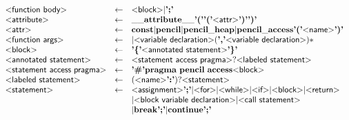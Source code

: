 \begin{figure}
\[\begin{array}{lcl}
  \text{\sf\textless function body\textgreater} & \gets & \text{\sf\textless block\textgreater} | \text{\bf';'}\\

  \text{\sf\textless attribute\textgreater} & \gets & \mathbf{\_\_attribute\_\_} \text{\bf'('}\text{\bf'('} \text{\sf\textless attr\textgreater} \text{\bf')'}\text{\bf')'}\\

  \text{\sf\textless attr\textgreater} & \gets & \mathbf{const} 
                          | \mathbf{pencil} 
                          | \mathbf{pencil\_heap}
                          |\mathbf{pencil\_access} \text{\bf'('} \text{\sf\textless name\textgreater} \text{\bf')'}
\\

  \text{\sf\textless function args\textgreater} & \gets & | \text{\sf\textless variable declaration\textgreater} (\text{\bf','} \text{\sf\textless variable declaration\textgreater})*\\

  \text{\sf\textless block\textgreater} & \gets & \text{\bf'\{'} \text{\sf\textless annotated statement\textgreater} \text{\bf'\}'}\\

  \text{\sf\textless annotated statement\textgreater} & \gets & \text{\sf\textless statement access pragma\textgreater}? \text{\sf\textless labeled statement\textgreater}\\
  \text{\sf\textless statement access pragma\textgreater} & \gets & \text{\bf'\#'} \mathbf{pragma} ~ \mathbf{pencil} ~ \mathbf{access} \text{\sf\textless block\textgreater}\\

  \text{\sf\textless labeled statement\textgreater} & \gets & (\text{\sf\textless name\textgreater} \text{\bf':'})?\text{\sf\textless statement\textgreater}\\

  \text{\sf\textless statement\textgreater} & \gets & \text{\sf\textless assignment\textgreater} \text{\bf';'}
                               | \text{\sf\textless for\textgreater}
                               | \text{\sf\textless while\textgreater}
                               | \text{\sf\textless if\textgreater}
                               | \text{\sf\textless block\textgreater}
                               | \text{\sf\textless return\textgreater}\\ & &
                               | \text{\sf\textless block variable declaration\textgreater}
                               | \text{\sf\textless call statement\textgreater}\\ & &
                               | \mathbf{break} \text{\bf';'}
                               | \mathbf{continue} \text{\bf';'}
  \\


\end{array}\]
\end{figure}
